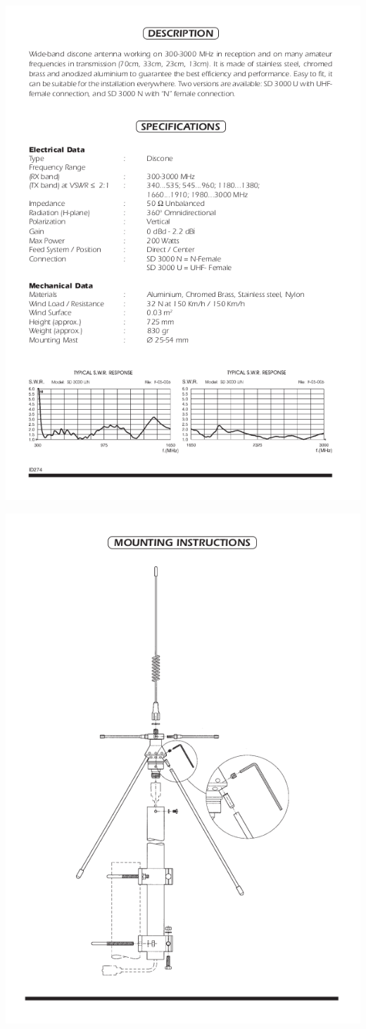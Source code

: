 \includegraphics[width=\textwidth]{content/appendix/sd3000-2.png}

\includegraphics[width=\textwidth]{content/appendix/sd3000-3.png}
